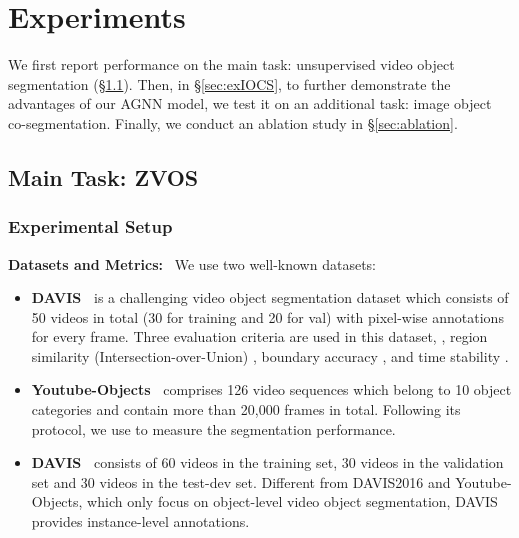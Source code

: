 \documentclass[10pt,twocolumn,letterpaper]{article}
\begin{document}
\vspace*{-4pt}
\section{Experiments}
	\vspace*{-2pt}	
We first report performance on the main task: {\color {black}unsupervised video object segmentation (\S\ref{sec:exUVOS})}. Then, in \S\ref{sec:exIOCS}, to further demonstrate the advantages of our AGNN model, we test it on an additional task: image object co-segmentation. Finally, we conduct an ablation study in \S\ref{sec:ablation}.
\vspace*{-3pt}
\subsection{Main Task: ZVOS}\label{sec:exUVOS}
\vspace*{-3pt}
\subsubsection{Experimental Setup}\label{sec:exUVOSimpl}
\vspace*{-6pt}
\noindent\textbf{Datasets and Metrics:}~ {\color{black}We use two well-known datasets:} \vspace*{-1pt}
\vspace*{-1pt}
\begin{itemize}[leftmargin=*]
	\setlength{\itemsep}{0pt}
	\setlength{\parsep}{-2pt}
	\setlength{\parskip}{-0pt}
	\setlength{\leftmargin}{-15pt}
	\vspace{-5pt}
	\item \textbf{DAVIS~\cite{perazzi2016benchmark}} is a challenging video object segmentation dataset which consists of 50 videos in total (30 for training and 20 for val) with pixel-wise annotations for every frame. Three evaluation criteria are used in this dataset, \ie, region similarity (Intersection-over-Union) , boundary accuracy , and time stability .
	


	\item \textbf{Youtube-Objects~\cite{DBLP:conf/cvpr/PrestLCSF12}} comprises 126 video sequences which belong to 10 object categories  and contain more than 20,000 frames in total. Following its protocol, we use  to measure the segmentation performance.
	\item \textbf{DAVIS~\cite{pont20172017}} consists of 60 videos in the training set, 30 videos in the validation set and 30 videos in the test-dev set. Different from DAVIS2016 and Youtube-Objects, which only focus on object-level video object segmentation, DAVIS provides instance-level annotations.
\vspace*{-3pt}
\end{itemize}
\end{document}

